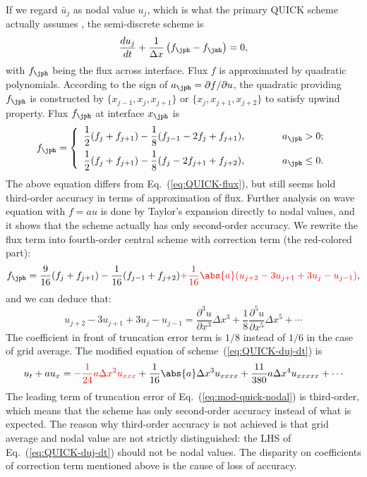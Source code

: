 \documentclass[]{article}
\begin{document}
If we regard $\bar u_j$ as nodal value $u_j$, which is what the primary QUICK
scheme actually assumes \cite{leonard1979stable}, the semi-discrete scheme is
\begin{equation}
    \frac{d u_j}{d t}+\frac{1}{\Delta x}\left(f_{\jph}-f_{\jmh}\right)=0,
    \label{eq:QUICK-duj-dt}
\end{equation}
with $f_\jph$ being the flux across interface. Flux $f$ is approximated by
quadratic polynomials. According to the sign of $a_\jph = \partial f/\partial
u$, the quadratic providing $f_\jph$ is constructed by $\{ x_{j-1}, x_j,
x_{j+1}
\}$ or $\{ x_j, x_{j+1}, x_{j+2} \}$ to satisfy upwind
property. Flux $f_\jph$ at interface $x_\jph$ is
\begin{equation*}
    f_{\jph}=\left\{\begin{array}{ll}
	\displaystyle
	\frac{1}{2}(f_j+f_{j+1})-\frac{1}{8}(f_{j-1}-2f_j+f_{j+1}),\hspace{1cm} & a_{\jph}>0;\\[3mm]
	\displaystyle
	\frac{1}{2}(f_j+f_{j+1})-\frac{1}{8}(f_j-2f_{j+1}+f_{j+2}),\hspace{1cm} & a_{\jph}\le 0.\\
    \end{array}\right.
\end{equation*}
The above equation differs from Eq.~(\ref{eq:QUICK-flux}), but still seems hold
third-order accuracy in terms of approximation of flux. Further analysis on wave
equation with $f=au$ is done
by Taylor's expansion directly to nodal values, and it shows that the scheme
actually has only second-order accuracy. We rewrite the flux term into
fourth-order central scheme with correction term (the red-colored part):
\begin{equation}
    f_{\jph}=\frac{9}{16}(f_j+f_{j+1})-\frac{1}{16}(f_{j-1}+f_{j+2}){\color{red}+\frac{1}{16}\abs{a}(u_{j+2}-3u_{j+1}+3u_{j}-u_{j-1})},
    \label{eq:QUICK-flux-nodal}
\end{equation}
and we can deduce that:
\[
    u_{j+2}-3u_{j+1}+3u_{j}-u_{j-1}=\frac{\partial^3 u}{\partial x^3}\Delta x^3+\frac{1}{8}\frac{\partial^5 u}{\partial x^5}\Delta x^5+\cdots
\]
The coefficient in front of truncation error term is $1/8$ instead of $1/6$ in
the case of grid average. The modified equation of
scheme~(\ref{eq:QUICK-duj-dt}) is 
\begin{equation}
    u_t+au_x={\color{red}-\frac{1}{24}a\Delta x^2 u_{xxx}}+\frac{1}{16}\abs{a}\Delta x^3 u_{xxxx}+\frac{11}{380}a\Delta x^4 u_{xxxxx} +\cdots
    \label{eq:mod-quick-nodal}
\end{equation}
The leading term of truncation error of Eq.~(\ref{eq:mod-quick-nodal}) is
third-order, which means that the scheme has only second-order accuracy instead
of what is expected. The reason why third-order accuracy is not achieved is that
grid average and nodal value are not strictly distinguished: the LHS of
Eq.~(\ref{eq:QUICK-duj-dt}) should not be nodal values. The disparity on
coefficients of correction term mentioned above is the cause of loss of
accuracy.
\end{document}
